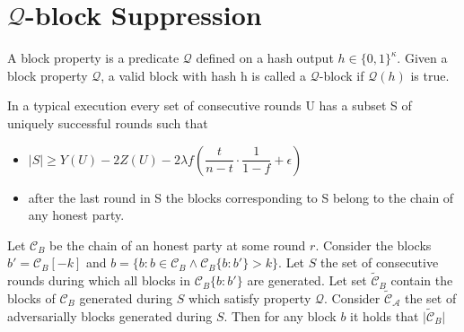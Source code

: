\section{$\mathcal{Q}$-block Suppression}
\begin{definition}
    \cite{dionyziz}
    A block property is a predicate $\mathcal{Q}$ defined on a hash output $h \in \{ 0, 1 \}^\kappa$. Given  a block property $\mathcal{Q}$, a valid block with hash h is called a $\mathcal{Q}$-block if $\mathcal{Q}(h)$ is true.
\end{definition}

\begin{lemma}[Unsuppressibility]\cite{dionyziz}
    In a typical execution every set of consecutive rounds U has a subset S of uniquely successful rounds such that
    \begin{itemize}
        \item $\vert S \vert \geq Y(U) - 2Z(U) - 2 \lambda f (\dfrac{t}{n-t} \cdot \dfrac{1}{1-f} + \epsilon)$
        \item after the last round in S the blocks corresponding to S belong to the chain of any honest party.
    \end{itemize}
\end{lemma}

\begin{lemma}
    Let $\mathcal{C}_B$ be the chain of an honest party at some round $r$. Consider the blocks $b' = \mathcal{C}_B[-k]$ and $b = \{b: b \in \mathcal{C}_B \wedge \mathcal{C}_B\{b:b'\} > k\}$. Let $S$ the set of consecutive rounds during which all blocks in $\mathcal{C}_B\{b:b'\}$ are generated. Let set $\widetilde{\mathcal{C}}_B$ contain the blocks of $\mathcal{C}_B$ generated during $S$ which satisfy property $\mathcal{Q}$.  Consider $\widetilde{\mathcal{C}}_\mathcal{A}$ the set of adversarially blocks generated during $S$. Then for any block $b$ it holds that $ \vert \widetilde{\mathcal{C}}_B \vert $
\end{lemma}
